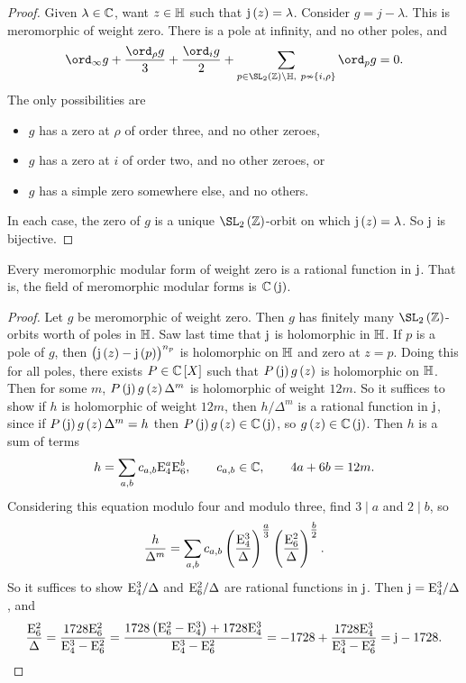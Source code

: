 \begin{proof}
Given $ \lambda \in \mathbb{C} $, want $ z \in \mathbb{H} $ such that $ \j\br{z} = \lambda $. Consider $ g = j - \lambda $. This is meromorphic of weight zero. There is a pole at infinity, and no other poles, and
$$ \ord_\infty g + \dfrac{\ord_\rho g}{3} + \dfrac{\ord_i g}{2} + \sum_{p \in \SL_2\br{\ZZ} \backslash \HH, \ p \nsim \cbr{i, \rho}} \ord_p g = 0. $$
The only possibilities are
\begin{itemize}
\item $ g $ has a zero at $ \rho $ of order three, and no other zeroes,
\item $ g $ has a zero at $ i $ of order two, and no other zeroes, or
\item $ g $ has a simple zero somewhere else, and no others.
\end{itemize}
In each case, the zero of $ g $ is a unique $ \SL_2\br{\ZZ} $-orbit on which $ \j\br{z} = \lambda $. So $ \mathrm{j} $ is bijective.
\end{proof}


\begin{theorem}
Every meromorphic modular form of weight zero is a rational function in $ \mathrm{j} $. That is, the field of meromorphic modular forms is $ \CC\br{\j} $.
\end{theorem}

\begin{proof}
Let $ g $ be meromorphic of weight zero. Then $ g $ has finitely many $ \SL_2\br{\ZZ} $-orbits worth of poles in $ \mathbb{H} $. Saw last time that $ \mathrm{j} $ is holomorphic in $ \mathbb{H} $. If $ p $ is a pole of $ g $, then $ \br{\j\br{z} - \j\br{p}}^{n_p} $ is holomorphic on $ \mathbb{H} $ and zero at $ z = p $. Doing this for all poles, there exists $ P \in \CC\sbr{X} $ such that $ P\br{\j}g\br{z} $ is holomorphic on $ \mathbb{H} $. Then for some $ m $, $ P\br{\j}g\br{z}\Delta^m $ is holomorphic of weight $ 12m $. So it suffices to show if $ h $ is holomorphic of weight $ 12m $, then $ h / \Delta^m $ is a rational function in $ \mathrm{j} $, since if $ P\br{\j}g\br{z}\Delta^m = h $ then $ P\br{\j}g\br{z} \in \CC\br{\j} $, so $ g\br{z} \in \CC\br{\j} $. Then $ h $ is a sum of terms
$$ h = \sum_{a, b} c_{a, b}\mathrm{E}_4^a\mathrm{E}_6^b, \qquad c_{a, b} \in \mathbb{C}, \qquad 4a + 6b = 12m. $$
Considering this equation modulo four and modulo three, find $ 3 \mid a $ and $ 2 \mid b $, so
$$ \dfrac{h}{\Delta^m} = \sum_{a, b} c_{a, b}\br{\dfrac{\E_4^3}{\Delta}}^{\tfrac{a}{3}}\br{\dfrac{\E_6^2}{\Delta}}^{\tfrac{b}{2}}. $$
So it suffices to show $ \mathrm{E}_4^3 / \Delta $ and $ \mathrm{E}_6^2 / \Delta $ are rational functions in $ \mathrm{j} $. Then $ \mathrm{j} = \mathrm{E}_4^3 / \Delta $, and
$$ \dfrac{\E_6^2}{\Delta} = \dfrac{1728\E_6^2}{\E_4^3 - \E_6^2} = \dfrac{1728\br{\E_6^2 - \E_4^3} + 1728\E_4^3}{\E_4^3 - \E_6^2} = -1728 + \dfrac{1728\E_4^3}{\E_4^3 - \E_6^2} = \j - 1728. $$
\end{proof}

